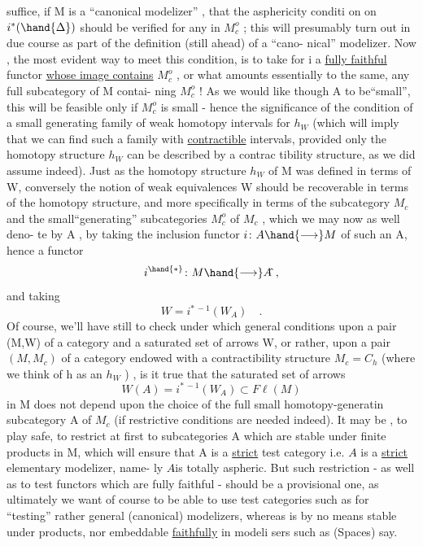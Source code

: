
suffice,  if M is a ``canonical modelizer'' ,  that the asphericity conditi
on on $i^*(\hand{\Delta})$  should be verified for any \hand{$\Delta$} in $M_c^o$ ;  this will presumably
turn out in due course as part of the definition (still ahead) of a ``cano-%
nical'' modelizer.  Now ,  the most evident way to meet this condition,  is
to take for i a \uline{fully faithful} functor \uline{whose image contains} $M_c^o$ ,  or
what amounts essentially to the same,  any full subcategory of M contai-%
ning $M_c^o$ !  As we would like though A to be``small'',  this will be feasible
only if $M_c^o$ is small  -  hence the significance of the condition of a
small generating family of weak homotopy intervals for $h_W$ (which will
imply that we can find such a family with \uline{contractible} intervals,  
provided only  the homotopy structure $h_W$ can be described by a contrac%
tibility structure,  as we did assume indeed).  Just as the homotopy
structure $h_W$ of M was defined in terms of W,  conversely the notion of
weak equivalences W  should be recoverable in terms of the homotopy
structure,  and more specifically in terms of the subcategory $M_c$ and the
small``generating'' subcategories $M_c^o$ of $M_c$ ,  which we may now as well deno-%
te by A ,  by taking the inclusion functor $i\colon A\hand{\longrightarrow} M$ of such an A,  hence
a functor
\[ i^{\hand{*}}\colon M \hand{\longrightarrow} A\hat{} \ , \]
and taking
\[ W = i^{*\,-1}(W_{A\hat{}}) \quad . \]
Of course, we'll have still to check under which general conditions upon
a pair (M,W) of a category and a saturated set of arrows W,  or rather,
upon a pair  $(M,M_c)$  of a category endowed with a contractibility
structure $M_c = C_h$  (where we think of h as an $h_W$ ) ,  is it true that
the saturated set of arrows
\[ W(A) = i^{*\,-1}(W_{A\hat{}}) \subset F\ell(M) \]
in M does not depend upon the choice of the full small homotopy-generatin%
subcategory A of $M_c$  (if restrictive conditions are needed indeed).  It
may be ,  to play safe,  to restrict at first to subcategories A
which are stable under finite products in M,  which will ensure that A is
a \uline{strict}  test category  i.e.  $A\hat{}$ is a \uline{strict} elementary modelizer,  name-%
ly $A\hat{}$is totally aspheric.  But such restriction  -  as well as to test
functors which are fully faithful  -  should be a provisional one,  as
ultimately we want of course to be able to use test categories such as
\hand{$\Delta$} for ``testing'' rather general (canonical) modelizers,  whereas \hand{$\Delta$} is
by no means stable under products,  nor embeddable \uline{faithfully} in modeli
sers such as (Spaces) say.

